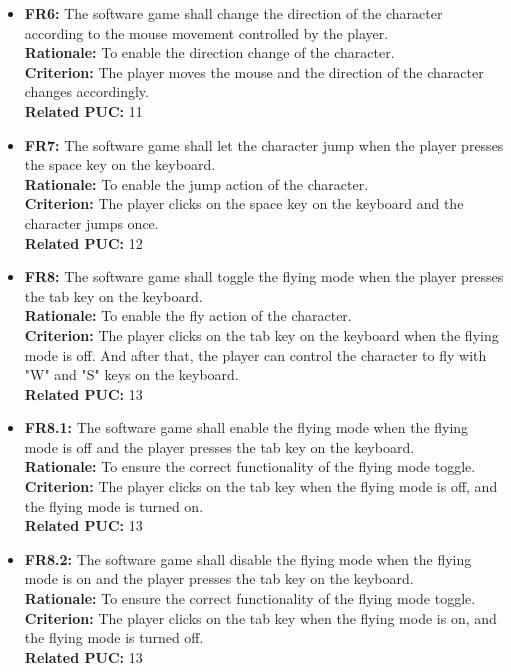 \documentclass[12pt, titlepage]{article}
\begin{document}
\begin{itemize}
        \item \textbf{FR6:} The software game shall change the direction of the character according to the mouse movement controlled by the player.\\
        \textbf{Rationale:} To enable the direction change of the character.\\
        \textbf{Criterion:} The player moves the mouse and the direction of the character changes accordingly.\\
        \textbf{Related PUC:} 11
        
        \item \textbf{FR7:} The software game shall let the character jump when the player presses the space key on the keyboard.\\
        \textbf{Rationale:} To enable the jump action of the character.\\
        \textbf{Criterion:} The player clicks on the space key on the keyboard and the character jumps once.\\
        \textbf{Related PUC:} 12
        
        \item \textbf{FR8:} The software game shall toggle the flying mode when the player presses the tab key on the keyboard.\\
        \textbf{Rationale:} To enable the fly action of the character.\\
        \textbf{Criterion:} The player clicks on the tab key on the keyboard when the flying mode is off. And after that, the player can control the character to fly with "W" and "S" keys on the keyboard.\\
        \textbf{Related PUC:} 13
        
        \item \textbf{FR8.1:} The software game shall enable the flying mode when the flying mode is off and the player presses the tab key on the keyboard.\\
        \textbf{Rationale:} To ensure the correct functionality of the flying mode toggle.\\
        \textbf{Criterion:} The player clicks on the tab key when the flying mode is off, and the flying mode is turned on.\\
        \textbf{Related PUC:} 13
        
        \item \textbf{FR8.2:} The software game shall disable the flying mode when the flying mode is on and the player presses the tab key on the keyboard.\\
        \textbf{Rationale:} To ensure the correct functionality of the flying mode toggle.\\
        \textbf{Criterion:} The player clicks on the tab key when the flying mode is on, and the flying mode is turned off.\\
        \textbf{Related PUC:} 13
        

\end{itemize}
\end{document}
